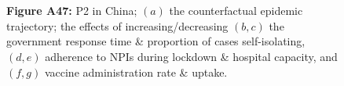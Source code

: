 \documentclass[paper=a4,fontsize=11pt]{article}
\begin{document}
\begin{figure}[!h]
  \\
  \hspace{1.76cm}
  \\
  \caption*{\textbf{Figure A47:} P2 in China; $(a)$ the counterfactual epidemic trajectory; the effects of increasing/decreasing $(b,c)$ the government response time \& proportion of cases self-isolating, $(d,e)$ adherence to NPIs during lockdown \& hospital capacity, and $(f,g)$ vaccine administration rate \& uptake.}
\end{figure}
\end{document}
